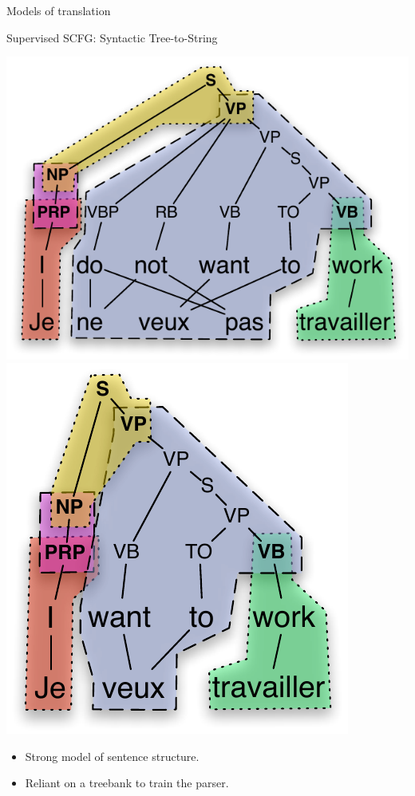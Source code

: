 \documentclass{beamer}
\begin{document}
\begin{frame}[t]{Models of translation}
\begin{exampleblock}{Supervised SCFG: Syntactic Tree-to-String}
\begin{center}
  \includegraphics[scale=0.55]{JeNeVeuxPasTravailler-tsg.pdf}
  \hspace{0.3in}
  \includegraphics[scale=0.55]{JeVeuxTravailler-tsg.pdf}
\end{center}
\end{exampleblock}
\begin{itemize}
\item Strong model of sentence structure.
\item Reliant on a treebank to train the parser.
\end{itemize}
\end{frame}
\end{document}
